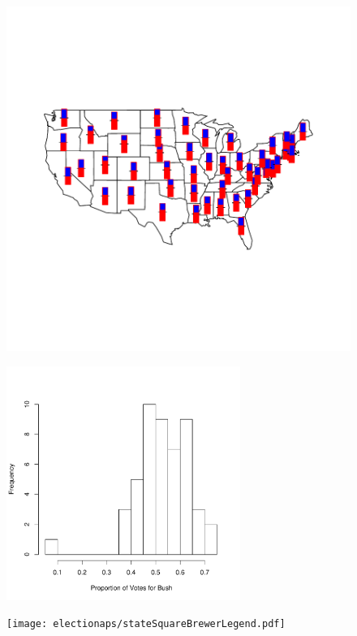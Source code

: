 \begin{figure}
\includegraphics{electionMaps/stateTherms.pdf}
\caption{}
\label{fig:stateTherms}
\end{figure}

\begin{figure}
\includegraphics[height=3in]{electionMaps/bushPropHist.pdf}
\caption{}
\label{fig:statePropHist}
\end{figure}

\begin{figure}
\texttt{[image: electionaps/stateSquareBrewerLegend.pdf]}
\caption{}
\label{fig:stateSquareBrewerLegend}
\end{figure}

